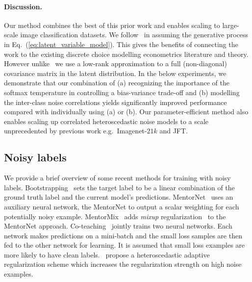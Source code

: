 \documentclass[final]{cvpr}
\begin{document}
\paragraph{Discussion.}
Our method combines the best of this prior work and enables scaling to large-scale image classification datasets. We follow~\citet{collier2020analysis} in assuming the generative process in Eq.\ (\ref{eq:latent_variable_model}). This gives the benefits of connecting the work to the existing discrete choice modelling econometrics literature and theory. However unlike~\citet{collier2020analysis} we use a low-rank approximation to a full (non-diagonal) covariance matrix in the latent distribution. In the below experiments, we demonstrate that our combination of (a) recognizing the importance of the softmax temperature in controlling a bias-variance trade-off and (b) modelling the inter-class noise correlations yields significantly improved performance compared with individually using (a) or (b). Our parameter-efficient method also enables scaling up correlated heteroscedastic noise models to a scale unprecedented by previous work e.g.\ Imagenet-$21k$ and JFT.

\subsection{Noisy labels}

We provide a brief overview of some recent methods for training with noisy labels. Bootstrapping~\cite{reed6596training} sets the target label to be a linear combination of the ground truth label and the current model's predictions. MentorNet~\cite{MentorNet.2018} uses an auxiliary neural network, the MentorNet to output a scalar weighting for each potentially noisy example. MentorMix~\cite{jiang2020beyond} adds \textit{mixup} regularization~\cite{zhang2018mixup} to the MentorNet approach. Co-teaching~\cite{CoTeaching.2018} jointly trains two neural networks. Each network makes predictions on a mini-batch and the small loss samples are then fed to the other network for learning. It is assumed that small loss examples are more likely to have clean labels.~\citet{cao2020heteroskedastic} propose a heteroscedastic adaptive regularization scheme which increases the regularization strength on high noise examples.
\end{document}

